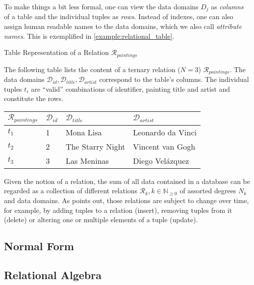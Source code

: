 To make things a bit less formal, one can view the data domains $D_j$ as \emph{columns} of a table and the individual tuples as \emph{rows}. Instead of indexes, one can also assign human readable names to the data domains, which we also call \emph{attribute names}. This is exemplified in \cref{example:relational_table}. 

\begin{example}[label=example:relational_table]{Table Representation of a Relation $\mathcal{R}_{paintings}$}{}
    
The following table lists the content of a ternary relation ($N = 3$) $\mathcal{R}_{paintings}$. The data domains $\mathcal{D}_{id}, \mathcal{D}_{title}, \mathcal{D}_{artist}$ correspond to the table's columns. The individual tuples $t_i$ are ``valid'' combinations of identifier, painting title and artist and constitute the rows.
    
    \begin{center}
        \begin{tabular}{ l || l | l | l |}
         $\mathcal{R}_{paintings}$ & $\mathcal{D}_{id}$ & $\mathcal{D}_{title}$  & $\mathcal{D}_{artist}$ \\ 
         \hline
         \hline
         $t_1$ &  1 & Mona Lisa &  Leonardo da Vinci \\
         \hline
         $t_2$ &  2 & The Starry Night & Vincent van Gogh \\
         \hline
         $t_3$ &  3 & Las Meninas & Diego Velázquez \\
         \hline
        \end{tabular}
    \end{center}
\end{example}


Given the notion of a relation, the sum of all data contained in a database can be regarded as a collection of different relations $\mathcal{R}_k, k \in \mathbb{N}_{\geq 0}$ of assorted degrees $N_k$ and data domains. As \cite{Codd:1970Relational} points out, those relations are subject to change over time, for example, by adding tuples to a relation (insert), removing tuples from it (delete) or altering one or multiple elements of a tuple (update).


\subsection{Normal Form}

\subsection{Relational Algebra}


